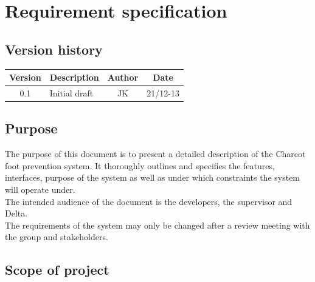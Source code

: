 



\chapter{Requirement specification}

\section{Version history}
\begin{table}[H]
\begin{tabular}{|c|p{9cm}|c|c|}
\hline
Version & Description & Author & Date\\
\hline
0.1 & Initial draft & JK & 21/12-13\\
\hline
\end{tabular}
\end{table}

\section{Purpose}
The purpose of this document is to present a detailed description of the Charcot foot prevention system. It thoroughly outlines and specifies the features, interfaces, purpose of the system as well as under which constraints the system will operate under.\\
The intended audience of the document is the developers, the supervisor and Delta.\\
The requirements of the system may only be changed after a review meeting with the group and stakeholders.\\

\section{Scope of project}


